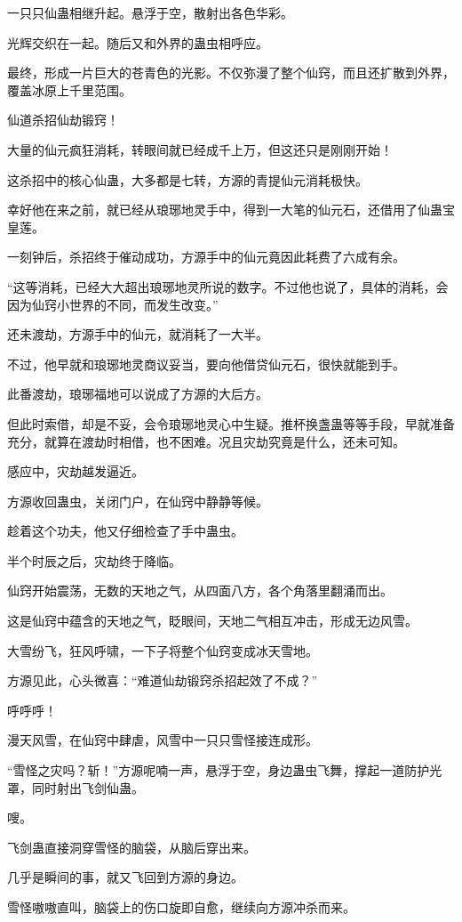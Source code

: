 \begin{this_body}
一只只仙蛊相继升起。悬浮于空，散射出各色华彩。

光辉交织在一起。随后又和外界的蛊虫相呼应。

最终，形成一片巨大的苍青色的光影。不仅弥漫了整个仙窍，而且还扩散到外界，覆盖冰原上千里范围。

仙道杀招仙劫锻窍！

大量的仙元疯狂消耗，转眼间就已经成千上万，但这还只是刚刚开始！

这杀招中的核心仙蛊，大多都是七转，方源的青提仙元消耗极快。

幸好他在来之前，就已经从琅琊地灵手中，得到一大笔的仙元石，还借用了仙蛊宝皇莲。

一刻钟后，杀招终于催动成功，方源手中的仙元竟因此耗费了六成有余。

“这等消耗，已经大大超出琅琊地灵所说的数字。不过他也说了，具体的消耗，会因为仙窍小世界的不同，而发生改变。”

还未渡劫，方源手中的仙元，就消耗了一大半。

不过，他早就和琅琊地灵商议妥当，要向他借贷仙元石，很快就能到手。

此番渡劫，琅琊福地可以说成了方源的大后方。

但此时索借，却是不妥，会令琅琊地灵心中生疑。推杯换盏蛊等等手段，早就准备充分，就算在渡劫时相借，也不困难。况且灾劫究竟是什么，还未可知。

感应中，灾劫越发逼近。

方源收回蛊虫，关闭门户，在仙窍中静静等候。

趁着这个功夫，他又仔细检查了手中蛊虫。

半个时辰之后，灾劫终于降临。

仙窍开始震荡，无数的天地之气，从四面八方，各个角落里翻涌而出。

这是仙窍中蕴含的天地之气，眨眼间，天地二气相互冲击，形成无边风雪。

大雪纷飞，狂风呼啸，一下子将整个仙窍变成冰天雪地。

方源见此，心头微喜：“难道仙劫锻窍杀招起效了不成？”

呼呼呼！

漫天风雪，在仙窍中肆虐，风雪中一只只雪怪接连成形。

“雪怪之灾吗？斩！”方源呢喃一声，悬浮于空，身边蛊虫飞舞，撑起一道防护光罩，同时射出飞剑仙蛊。

嗖。

飞剑蛊直接洞穿雪怪的脑袋，从脑后穿出来。

几乎是瞬间的事，就又飞回到方源的身边。

雪怪嗷嗷直叫，脑袋上的伤口旋即自愈，继续向方源冲杀而来。


\end{this_body}
